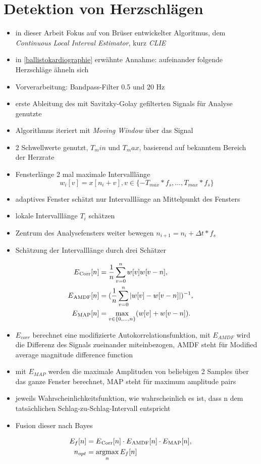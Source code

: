 \section{Detektion von Herzschlägen}\label{CLIE}

	\begin{itemize}
		\item in dieser Arbeit Fokus auf von Brüser entwickelter Algoritmus, dem \textit{Continuous Local Interval Estimator}, kurz \textit{CLIE}
		\item in \ref{ballistokardiographie} erwähnte Annahme: aufeinander folgende Herzschläge ähneln sich
		\item Vorverarbeitung: Bandpass-Filter 0.5 und 20 Hz
		\item erste Ableitung des mit Savitzky-Golay gefilterten Signals für Analyse genutzte
		\item Algorithmus iteriert mit \textit{Moving Window} über das Signal
		\item 2 Schwellwerte genutzt, $T_min$ und $T_max$, basierend auf bekanntem Bereich der Herzrate
		\item Fensterlänge 2 mal maximale Intervalllänge \[w_i[v] = x[n_i + v], v \in \{ -T_{max} * f_s, ..., T_{max} * f_s\} \]
		\item adaptives Fenster schätzt nur Intervalllänge an Mittelpunkt des Fensters
		\item lokale Intervalllänge $T_i$ schätzen
		\item Zentrum des Analysefensters weiter bewegen $n_{i+1} = n_i + \Delta t * f_s$
		\item Schätzung der Intervalllänge durch drei Schätzer
	\end{itemize}
	
	\begin{align*}
		E\textsubscript{Corr}[n] &= \frac{1}{n} \sum_{v=0}^{n} w[v]w[v-n],\\
		E\textsubscript{AMDF}[n] &= (\frac{1}{n} \sum_{v=0}^{n} |w[v]-w[v-n]|)^{-1},\\
		E\textsubscript{MAP}[n] &= \max_{v \in \{0,...,n\}}(w[v]+w[v-n]).
	\end{align*}
	
	\begin{itemize}
		\item $E_{corr}$ berechnet eine modifizierte Autokorrelationsfunktion, mit $E_{AMDF}$ wird die Differenz des Signals zueinander miteinbezogen, AMDF steht für Modified average magnitude difference function
		\item mit $E_{MAP}$ werden die maximale Amplituden von beliebigen 2 Samples über das ganze Fenster berechnet, MAP steht für maximum amplitude pairs
		\item jeweils Wahrscheinlichkeitsfunktion, wie wahrscheinlich es ist, dass n dem tatsächlichen Schlag-zu-Schlag-Intervall entspricht
		\item Fusion dieser nach Bayes
	\end{itemize}
	\begin{align*}
		E_f[n] &= E\textsubscript{Corr}[n] \cdot E\textsubscript{AMDF}[n] \cdot E\textsubscript{MAP}[n],\\
		n_{opt} &= \operatorname*{argmax}_{n} E_f[n]	
	\end{align*}
	
